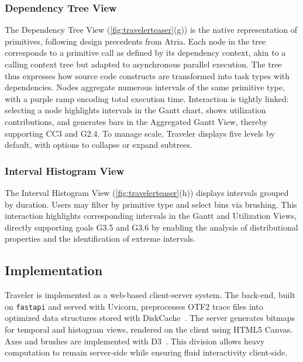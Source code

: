 \begin{refsection}
\subsubsection{Dependency Tree View} 
\label{subsec:dependencytree}

The Dependency Tree View (\autoref{fig:travelerteaser}(g)) is the native representation of primitives, following design precedents from Atria. Each node in the tree corresponds to a primitive call as defined by its dependency context, akin to a calling context tree but adapted to asynchronous parallel execution. The tree thus expresses how source code constructs are transformed into task types with dependencies. Nodes aggregate numerous intervals of the same primitive type, with a purple ramp encoding total execution time. Interaction is tightly linked: selecting a node highlights intervals in the Gantt chart, shows utilization contributions, and generates bars in the Aggregated Gantt View, thereby supporting CC3 and G2.4. To manage scale, Traveler displays five levels by default, with options to collapse or expand subtrees.

\subsubsection{Interval Histogram View} 

The Interval Histogram View (\autoref{fig:travelerteaser}(h)) displays intervals grouped by duration. Users may filter by primitive type and select bins via brushing. This interaction highlights corresponding intervals in the Gantt and Utilization Views, directly supporting goals G3.5 and G3.6 by enabling the analysis of distributional properties and the identification of extreme intervals.

\subsection{Implementation}
\label{subsec:implementation}

Traveler is implemented as a web-based client-server system. The back-end, built on \texttt{fastapi} and served with Uvicorn, preprocesses OTF2 trace files into optimized data structures stored with DiskCache~\cite{diskcache}. The server generates bitmaps for temporal and histogram views, rendered on the client using HTML5 Canvas. Axes and brushes are implemented with D3~\cite{bostock2011d3}. This division allows heavy computation to remain server-side while ensuring fluid interactivity client-side.


\end{refsection}
